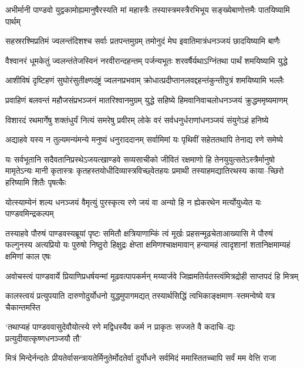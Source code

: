 \twolineshloka
{अभीर्मानी पाण्डवो युद्वकामोह्यमानुषैरस्यति मां महास्त्रैः}
{तस्यास्त्रमस्त्रैरभिभूय सङ्ख्येबाणोत्तमैः पातयिष्यामि पार्थम्}


\twolineshloka
{सहस्ररश्मिप्रतिमं ज्वलन्तंदिशश्च सर्वाः प्रतपन्तमुग्रम्}
{तमोनुदं मेघ इवातिमात्रंधनञ्जयं छादयिष्यामि बाणैः}


\twolineshloka
{वैश्वानरं धूमकेतुं ज्वलन्तंतेजस्विनं नरवीरान्दहन्तम्}
{पर्जन्यभूतः शरवर्षैर्यथाऽग्निंतथा पार्थं शमयिष्यामि युद्धे}


\twolineshloka
{आशीविषं दृष्टिहणं सुघोरंसुतीक्ष्णदंष्ट्रं ज्वलनप्रभवाम्}
{क्रोधात्प्रदीप्तानलवद्दहन्तंकुन्तीपुत्रं शमयिष्यामि भल्लैः}


\threelineshloka
{प्रवाहिणं बलवन्तं महौजसंप्रभञ्जनं मातरिश्वानमुग्रम्}
{युद्धे सहिष्ये हिमवानिवाचलोधनञ्जयं क्रुद्धममृष्यमाणम्}
{}


\twolineshloka
{विशारदं रथमार्गेषु शक्तंधुर्यं नित्यं समरेषु प्रवीरम्}
{लोके वरं सर्वधनुर्धराणांधनञ्जयं संयुगेऽहं हनिष्ये}


\twolineshloka
{अद्याहवे यस्य न तुल्यमन्यंमन्ये मनुष्यं धनुराददानम्}
{सर्वामिमां यः पृथिवीं सहेततथापि तेनाद्य रणे समेष्ये}


यः सर्वभूतानि सदैवतानिप्रस्थेऽजयत्खाण्डवे सव्यसाचीको जीवितं रक्षमाणो हि तेनयुयुत्सतेऽस्त्रैर्मानुषो मामृतेऽन्यः
\threelineshloka
{मानी कृतास्त्रः कृतहस्तयोधीदिव्यास्त्रविच्छ्वेतहयः प्रमाथी}
{तस्याहमद्यातिरथस्य काया--च्छिरो हरिष्यामि शितैः पृषत्कैः}
{}


\twolineshloka
{योत्स्याम्येनं शल्य धनञ्जयं वैमृत्युं पुरस्कृत्य रणे जयं वा}
{अन्यो हि न ह्येकरथेन मर्त्योयुध्येत यः पाण्डवमिन्द्रकल्पम्}


तस्याहवे पौरुषं पाण्डवस्यब्रूयां पृष्टः समितौ क्षत्रियाणाम्किं त्वं मूर्खः प्रहसन्मूढचेताआख्यासि मे पौरुषं फल्गुनस्य
\twolineshloka
{अत्यप्रियो यः पुरुषो निष्ठुरो हिक्षुद्रः क्षेप्ता क्षमिणश्चाक्षमावान्}
{हन्यामहं त्वादृशानां शतानिक्षमाम्यहं क्षमिणां काल एषः}


\twolineshloka
{अवोचस्त्वं पाण्डवार्ये प्रियाणिप्रधर्षयन्मां मूढवत्पापकर्मन्}
{मय्यार्जवे जिह्ममतिर्यतस्त्वंमित्रद्रोही साप्तपदं हि मित्रम्}


\twolineshloka
{कालस्त्वयं प्रत्युपयाति दारुणोदुर्योधनो युद्धमुपागमद्यत्}
{तस्यार्थसिद्धिं त्वभिकाङ्क्षमाण--स्तमन्वेष्ये यत्र चैकान्तमस्ति}


\twolineshloka
{`तथाप्यहं पाण्डववासुदेवौयोत्स्ये रणे मद्विधस्यैव कर्म}
{न प्राकृतः सज्जते वै कदाचि--द्यः प्रत्युदीयात्कृष्णधनञ्जयौ तौ'}


\twolineshloka
{मित्रं मिन्देर्नन्दतेः प्रीयतेर्वासन्त्रायतेर्मिनुतेर्मोदतेर्वा}
{दुर्योधने सर्वमिदं ममास्तितच्चापि सर्वं मम वेत्ति राजा}


